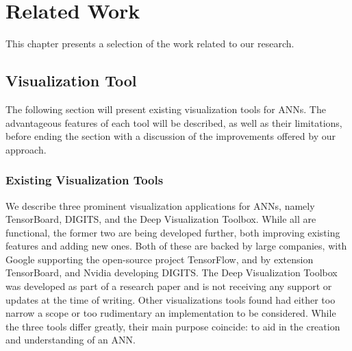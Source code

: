 
\chapter{Related Work}

This chapter presents a selection of the work related to our research.

\section{Visualization Tool}


The following section will present existing visualization tools for ANNs. The advantageous features of each tool will be described, as well as their limitations, before ending the section with a discussion of the improvements offered by our approach. 

\subsection{Existing Visualization Tools}

\begin{comment}
\textit{The following are the most prominent visualization applications for ANNs. Other alternatives were found to be either too specific in what they provide, or not even in a working state of implementation. The three tools are very different in terms of functionality and the frameworks they support, but their main purpose is still the same: to aid in the creation and understanding of an artificial neural network.}
\end{comment}

We describe three prominent visualization applications for ANNs, namely TensorBoard, DIGITS, and the Deep Visualization Toolbox. While all are functional, the former two are being developed further, both improving existing features and adding new ones. Both of these are backed by large companies, with Google supporting the open-source project TensorFlow, and by extension TensorBoard, and Nvidia developing DIGITS. The Deep Visualization Toolbox was developed as part of a research paper and is not receiving any support or updates at the time of writing. Other visualizations tools found had either too narrow a scope or too rudimentary an implementation to be considered. While the three tools differ greatly, their main purpose coincide: to aid in the creation and understanding of an ANN.

